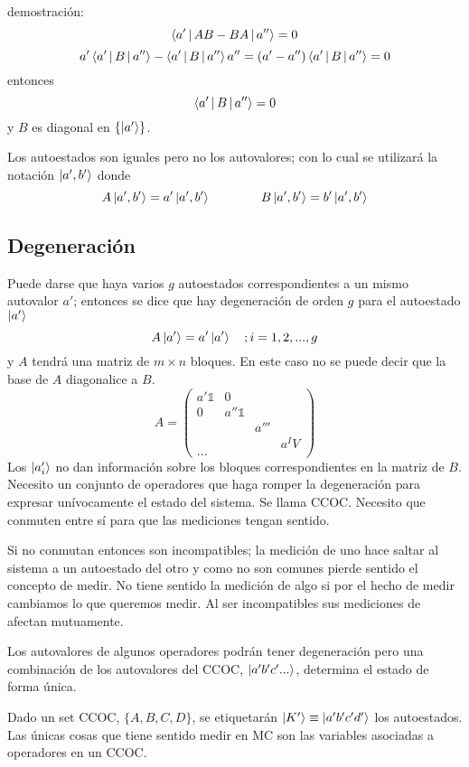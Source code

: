 \documentclass[10pt,oneside]{CBFT_book}
\begin{document}
demostración:
\[
	\Braket{a'|AB-BA|a''} = 0 
\]
\[
	a' \Braket{a'|B|a''} - \Braket{a'|B|a''} a''= (a'-a'') \Braket{a'|B|a''}= 0 
\]
entonces 
\[
	\Braket{a'|B|a''} = 0
\]
y $B$ es diagonal en $\{ \Ket{a'}\}$.

Los autoestados son iguales pero no los autovalores; con lo cual se utilizará la notación $\Ket{a',b'}$ donde 
\[
	A \Ket{a',b'} = a' \Ket{a',b'} \qquad \qquad B \Ket{a',b'} = b' \Ket{a',b'}
\]

\subsection{Degeneración}

Puede darse que haya varios $g$ autoestados correspondientes a un mismo autovalor $a'$; entonces se dice que hay 
degeneración de orden $g$ para el autoestado $\Ket{a'}$
\[
	A\Ket{a'}= a'\Ket{a'} \quad ; i=1,2,...,g
\]
y $A$ tendrá una matriz de $m\times n$ bloques. 
En este caso no se puede decir que la base de $A$ diagonalice a $B$.
\[
	A = \begin{pmatrix}
	     a'\mathbb{1} & 0 & & \\
	     0 & a''\mathbb{1} & & \\
	     & & a'''& \\
	     & & & a^IV \\
	     ...
	    \end{pmatrix}
\]
Los $\ket{a'_i}$ no dan información sobre los bloques correspondientes en la matriz de $B$.
Necesito un conjunto de operadores que haga romper la degeneración para expresar unívocamente 
el estado del sistema. Se llama CCOC. Necesito que conmuten entre sí para que las mediciones tengan sentido.

Si no conmutan entonces son incompatibles; la medición de uno hace saltar al sistema a un autoestado del otro y como no 
son comunes pierde sentido el concepto de medir. No tiene sentido la medición de algo si por el hecho de medir 
cambiamos lo que queremos medir.
Al ser incompatibles sus mediciones de afectan mutuamente.

Los autovalores de algunos operadores podrán tener degeneración pero una combinación de los autovalores del CCOC, 
$\Ket{a'b'c'...}$, determina el estado de forma única.

Dado un set CCOC, $\{A,B,C,D\}$, se etiquetarán $\Ket{K'} \equiv \Ket{a'b'c'd'}$ los autoestados.
Las únicas cosas que tiene sentido medir en MC son las variables asociadas a operadores en un CCOC.
\end{document}
